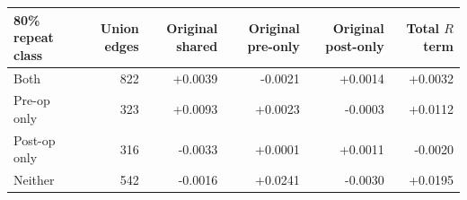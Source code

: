 \begin{tabular}{lrrrrr}
\toprule
80\% repeat class & Union edges & Original shared & Original pre-only & Original post-only & Total $R$ term \\
\midrule
Both & 822 & +0.0039 & -0.0021 & +0.0014 & +0.0032 \\
Pre-op only & 323 & +0.0093 & +0.0023 & -0.0003 & +0.0112 \\
Post-op only & 316 & -0.0033 & +0.0001 & +0.0011 & -0.0020 \\
Neither & 542 & -0.0016 & +0.0241 & -0.0030 & +0.0195 \\
\bottomrule
\end{tabular}
